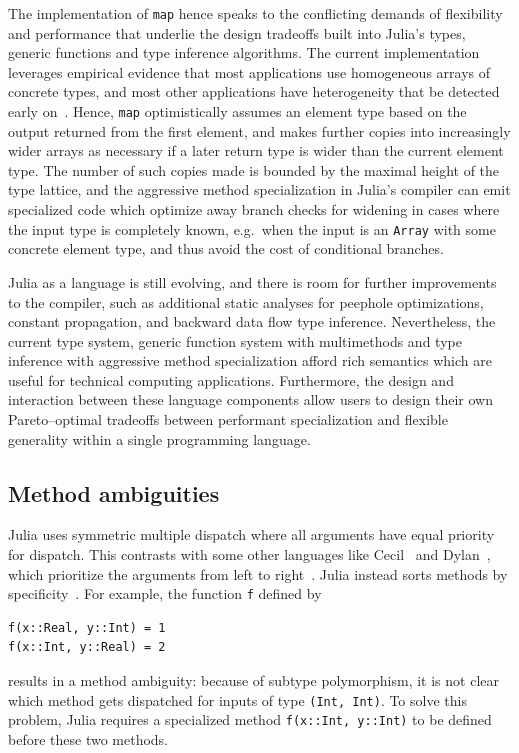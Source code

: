 \documentclass[pldi]{sigplanconf-pldi15}
\begin{document}
The implementation of \verb|map| hence speaks to the conflicting demands of
flexibility and performance that underlie the design tradeoffs built into
Julia's types, generic functions and type inference algorithms. The current
implementation leverages empirical evidence that most applications use
homogeneous arrays of concrete types, and most other applications have
heterogeneity that be detected early on~\cite{Bolz2013}. Hence, \verb|map|
optimistically assumes an element type based on the output returned from the
first element, and makes further copies into increasingly wider arrays as
necessary if a later return type is wider than the current element type. The
number of such copies made is bounded by the maximal height of the type
lattice, and the aggressive method specialization in Julia's compiler can emit
specialized code which optimize away branch checks for widening in cases where
the input type is completely known, e.g.\ when the input is an \verb|Array|
with some concrete element type, and thus avoid the cost of conditional
branches.

Julia as a language is still evolving, and there is room for further
improvements to the compiler, such as additional static analyses for peephole
optimizations, constant propagation, and backward data flow type inference.
Nevertheless, the current type system, generic function system with
multimethods and type inference with aggressive method specialization afford
rich semantics which are useful for technical computing applications.
Furthermore, the design and interaction between these language components allow
users to design their own Pareto--optimal tradeoffs between performant
specialization and flexible generality within a single programming language.


\subsection{Method ambiguities}

Julia uses symmetric multiple dispatch where all arguments have equal priority
for dispatch. This contrasts with some other languages like
Cecil~\cite{Chambers1992,Chambers1994} and Dylan~\cite{dylanman}, which
prioritize the arguments from left to right~\cite{Agrawal1991}. Julia instead
sorts methods by specificity~\cite{Bezanson2012}. For example, the function
\verb|f| defined by 

\begin{lstlisting}
f(x::Real, y::Int) = 1
f(x::Int, y::Real) = 2
\end{lstlisting}
%
results in a method ambiguity: because of subtype polymorphism, it is not clear
which method gets dispatched for inputs of type \verb|(Int, Int)|. To solve
this problem, Julia
requires a specialized method \verb|f(x::Int, y::Int)| to be defined before
these two methods.
\end{document}
